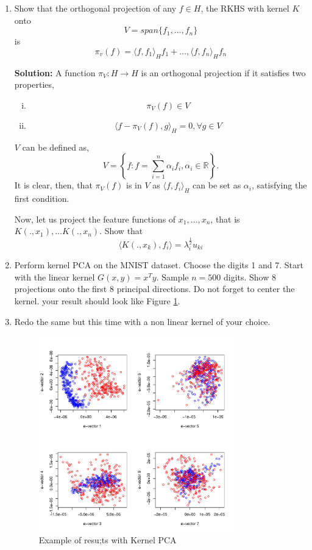 \documentclass{article}[12pt]
\begin{document}
\begin{enumerate}
\item Show that the orthogonal projection of any $f \in H$, the RKHS with kernel $K$ onto 
\begin{equation}
V=span\{f_1,\ldots,f_n\}
\end{equation} is 
\begin{equation}
\pi_v(f)=\langle f,f_1\rangle_H f_1+\ldots,\langle f,f_n\rangle_H f_n
\end{equation}

\textbf{Solution:} A function $\pi_V : H \rightarrow H$ is an orthogonal projection if it satisfies two properties,
\begin{enumerate}[(i)]
	\item \[
			\pi_V(f) \in V
	\]
	\item \[
			\langle f- \pi_V(f), g \rangle_H = 0, \forall g \in V
	\] 
\end{enumerate}
$V$ can be defined as,
\begin{equation}
	V = \left\{ f: f = \sum^{n}_{i=1} \alpha_i f_i, \alpha_i \in \mathbb R   \right\}.
\end{equation}
It is clear, then, that $\pi_V(f)$ is in $V$ as $\langle f, f_i \rangle_H$ can be set as $\alpha_i$, satisfying the first condition. 


Now, let us project the feature functions of $x_1,\ldots,x_n$, that is $K(.,x_1), \ldots K(.,x_n)$. Show that 
 \begin{equation}
\langle K(.,x_k),f_i \rangle = \lambda_i^\frac{1}{2} u_{ki}
\end{equation}
\item Perform kernel PCA on the MNIST dataset. Choose the digits 1 and 7. Start with the linear kernel $G(x,y)=x^Ty$. Sample $n=500$ digits. Show 8 projections onto the first 8 principal directions. Do not forget to center the kernel. your result should look like Figure \ref{fig:kpca}. 
\item Redo the same but this time with a non linear kernel of your choice. 
\begin{figure}
\includegraphics[width=0.8\textwidth]{kpca-mnist-linear.pdf}
\caption{\label{fig:kpca}Example of resu;ts with Kernel PCA}
\end{figure}
\end{enumerate}
\end{document}
